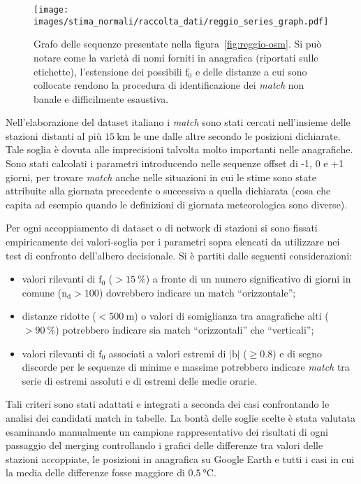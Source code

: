 \begin{figure}[ht]
  \centering
  \texttt{[image: images/stima\_normali/raccolta\_dati/reggio\_series\_graph.pdf]}
  \caption{\small Grafo delle sequenze presentate nella figura~\ref{fig:reggio-osm}. Si può notare come la varietà di nomi forniti in anagrafica (riportati sulle etichette), l'estensione dei possibili \(\mathrm{f}_0\) e delle distanze a cui sono collocate rendono la procedura di identificazione dei \emph{match} non banale e difficilmente esaustiva.}\label{fig:reggio-graph}
\end{figure}

Nell'elaborazione del dataset italiano i \emph{match} sono stati cercati nell'insieme delle stazioni distanti al più \(15\:\mathrm{km}\) le une dalle altre secondo le posizioni dichiarate. Tale soglia è dovuta alle imprecisioni talvolta molto importanti nelle anagrafiche. Sono stati calcolati i parametri introducendo nelle sequenze offset di -1, 0 e +1 giorni, per trovare \emph{match} anche nelle situazioni in cui le stime sono state attribuite alla giornata precedente o successiva a quella dichiarata (cosa che capita ad esempio quando le definizioni di giornata meteorologica sono diverse).

Per ogni accoppiamento di dataset o di network di stazioni si sono fissati empiricamente dei valori-soglia per i parametri sopra elencati da utilizzare nei test di confronto dell'albero decisionale. Si è partiti dalle seguenti considerazioni:

\begin{itemize}
  \item
    valori rilevanti di \(\mathrm{f}_0\) (\(> \qty{15}{\percent}\)) a fronte di un numero significativo di giorni in comune (\(\mathrm{n_d} > 100\)) dovrebbero indicare un match ``orizzontale'';
  \item
    distanze ridotte (\(< 500\:\mathrm{m}\)) o valori di somiglianza tra anagrafiche alti (\(> \qty{90}{\percent}\)) potrebbero indicare sia match ``orizzontali'' che ``verticali'';
  \item
    valori rilevanti di \(\mathrm{f}_0\) associati a valori estremi di \(|\mathrm{b}|\) (\(\ge 0.8\)) e di segno discorde per le sequenze di minime e massime potrebbero indicare \emph{match} tra serie di estremi assoluti e di estremi delle medie orarie.
\end{itemize}

Tali criteri sono stati adattati e integrati a seconda dei casi confrontando le analisi dei candidati match in tabelle. La bontà delle soglie scelte è stata valutata esaminando manualmente un campione rappresentativo dei risultati di ogni passaggio del merging controllando i grafici delle differenze tra valori delle stazioni accoppiate, le posizioni in anagrafica su Google Earth e tutti i casi in cui la media delle differenze fosse maggiore di \(\qty{0.5}{\degreeCelsius}\).

